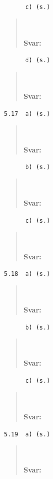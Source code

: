 \documentclass[a4paper]{article}
\newcommand{\tskcol}[1]{\textcolor{tskcol}{#1}}
\begin{document}
	\texttt{\tskcol{~~~~~~c) (s.)}}
	\begin{quotation}
		\noindent
		\\ \\
		\textbf{Svar:}
	\end{quotation}
	
	\texttt{\tskcol{~~~~~~d) (s.)}}
	\begin{quotation}
		\noindent
		\\ \\
		\textbf{Svar:}
	\end{quotation}
	
	\texttt{\tskcol{5.17~~a) (s.)}}
	\begin{quotation}
		\noindent
		\\ \\
		\textbf{Svar:}
	\end{quotation}
	
	\texttt{\tskcol{~~~~~~b) (s.)}}
	\begin{quotation}
		\noindent
		\\ \\
		\textbf{Svar:}
	\end{quotation}
	
	\texttt{\tskcol{~~~~~~c) (s.)}}
	\begin{quotation}
		\noindent
		\\ \\
		\textbf{Svar:}
	\end{quotation}
	
	\texttt{\tskcol{5.18~~a) (s.)}}
	\begin{quotation}
		\noindent
		\\ \\
		\textbf{Svar:}
	\end{quotation}
	
	\texttt{\tskcol{~~~~~~b) (s.)}}
	\begin{quotation}
		\noindent
		\\ \\
		\textbf{Svar:}
	\end{quotation}
	
	\texttt{\tskcol{~~~~~~c) (s.)}}
	\begin{quotation}
		\noindent
		\\ \\
		\textbf{Svar:}
	\end{quotation}
	
	\texttt{\tskcol{5.19~~a) (s.)}}
	\begin{quotation}
		\noindent
		\\ \\
		\textbf{Svar:}
	\end{quotation}
	
\end{document}
